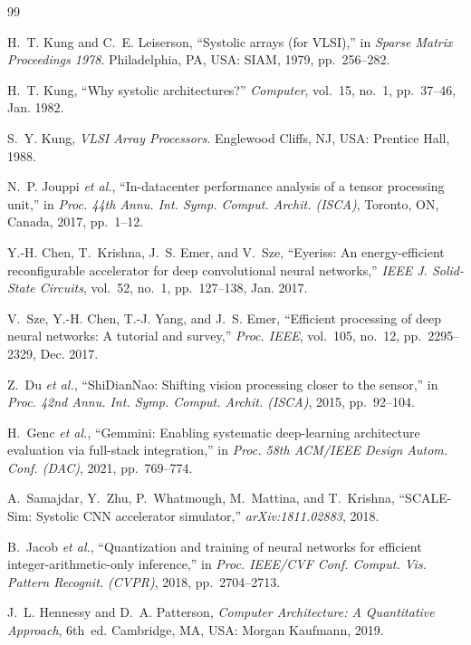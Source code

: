 \documentclass[conference]{IEEEtran}
\begin{document}
\begin{thebibliography}{99}

H.~T. Kung and C.~E. Leiserson, ``Systolic arrays (for VLSI),'' in
\emph{Sparse Matrix Proceedings 1978}. Philadelphia, PA, USA: SIAM, 1979,
pp.~256--282.

H.~T. Kung, ``Why systolic architectures?'' \emph{Computer}, vol.~15, no.~1,
pp.~37--46, Jan. 1982.

S.~Y. Kung, \emph{VLSI Array Processors}. Englewood Cliffs, NJ, USA:
Prentice Hall, 1988.

N.~P. Jouppi \emph{et al.}, ``In-datacenter performance analysis of a tensor
processing unit,'' in \emph{Proc. 44th Annu. Int. Symp. Comput. Archit.
(ISCA)}, Toronto, ON, Canada, 2017, pp.~1--12.

Y.-H. Chen, T.~Krishna, J.~S. Emer, and V.~Sze, ``Eyeriss: An
energy-efficient reconfigurable accelerator for deep convolutional neural
networks,'' \emph{IEEE J. Solid-State Circuits}, vol.~52, no.~1,
pp.~127--138, Jan. 2017.

V.~Sze, Y.-H. Chen, T.-J. Yang, and J.~S. Emer, ``Efficient processing of deep
neural networks: A tutorial and survey,'' \emph{Proc. IEEE}, vol.~105,
no.~12, pp.~2295--2329, Dec. 2017.

Z.~Du \emph{et al.}, ``ShiDianNao: Shifting vision processing closer to the
sensor,'' in \emph{Proc. 42nd Annu. Int. Symp. Comput. Archit. (ISCA)},
2015, pp.~92--104.

H.~Genc \emph{et al.}, ``Gemmini: Enabling systematic deep-learning
architecture evaluation via full-stack integration,'' in \emph{Proc. 58th
ACM/IEEE Design Autom. Conf. (DAC)}, 2021, pp.~769--774.

A.~Samajdar, Y.~Zhu, P.~Whatmough, M.~Mattina, and T.~Krishna, ``SCALE-Sim:
Systolic CNN accelerator simulator,'' \emph{arXiv:1811.02883}, 2018.

B.~Jacob \emph{et al.}, ``Quantization and training of neural networks for
efficient integer-arithmetic-only inference,'' in \emph{Proc. IEEE/CVF Conf.
Comput. Vis. Pattern Recognit. (CVPR)}, 2018, pp.~2704--2713.

J.~L. Hennessy and D.~A. Patterson, \emph{Computer Architecture: A
Quantitative Approach}, 6th~ed. Cambridge, MA, USA: Morgan Kaufmann, 2019.


\end{thebibliography}
\end{document}
